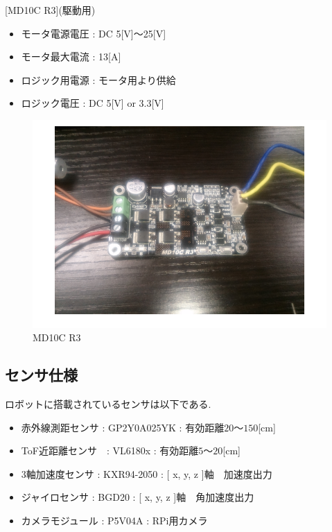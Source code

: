 \documentclass[10pt,a4j]{ujarticle}
\begin{document}
[MD10C R3](駆動用)
\begin{itemize}
 \item モータ電源電圧 : DC 5[V]$〜$25[V]
 \item モータ最大電流 : 13[A]
 \item ロジック用電源 : モータ用より供給
 \item ロジック電圧   : DC 5[V] or 3.3[V]
\end{itemize}

\begin{figure}[h]
 \centering
 \includegraphics[width=0.5\hsize]{./picture/MD10C.png}
    \caption{MD10C R3}
    \label{MD10C}
\end{figure}

\newpage
\subsection{センサ仕様}
ロボットに搭載されているセンサは以下である.
\begin{itemize}
 \item 赤外線測距センサ : GP2Y0A025YK : 有効距離$20 〜 150$[cm]
 \item ToF近距離センサ　: VL6180x    : 有効距離$5 〜 20$[cm]
 \item 3軸加速度センサ : KXR94-2050 : [ x, y, z ]軸　加速度出力
 \item ジャイロセンサ : BGD20 : [ x, y, z ]軸　角加速度出力
 \item カメラモジュール : P5V04A : RPi用カメラ
\end{itemize}
\end{document}
